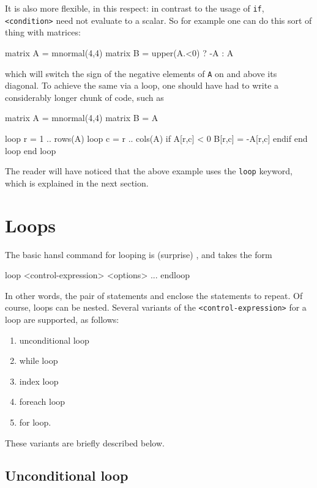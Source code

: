 It is also
more flexible, in this respect: in contrast to the usage of
\texttt{if}, \texttt{<condition>} need not evaluate to a scalar.  So
for example one can do this sort of thing with matrices:
\begin{code}
matrix A = mnormal(4,4)
matrix B = upper(A.<0) ? -A : A
\end{code}
which will switch the sign of the negative elements of \texttt{A} on
and above its diagonal. To achieve the same via a loop, one should
have had to write a considerably longer chunk of code, such as
\begin{code}
matrix A = mnormal(4,4)
matrix B = A

loop r = 1 .. rows(A)
  loop c = r .. cols(A)
     if A[r,c] < 0
       B[r,c] = -A[r,c]
     endif
  end loop
end loop
\end{code}

The reader will have noticed that the above example uses the
\texttt{loop} keyword, which is explained in the next section.

\section{Loops}
\label{sec:hr-loops}

The basic hansl command for looping is (surprise) , and
takes the form
\begin{code}
loop <control-expression> <options>
    ...
endloop
\end{code}
In other words, the pair of statements  and 
enclose the statements to repeat. Of course, loops can be nested.
Several variants of the \texttt{<control-expression>} for a loop are
supported, as follows:
\begin{enumerate}
\item unconditional loop
\item while loop
\item index loop
\item foreach loop
\item for loop.
\end{enumerate}
These variants are briefly described below.

\subsection{Unconditional loop}

